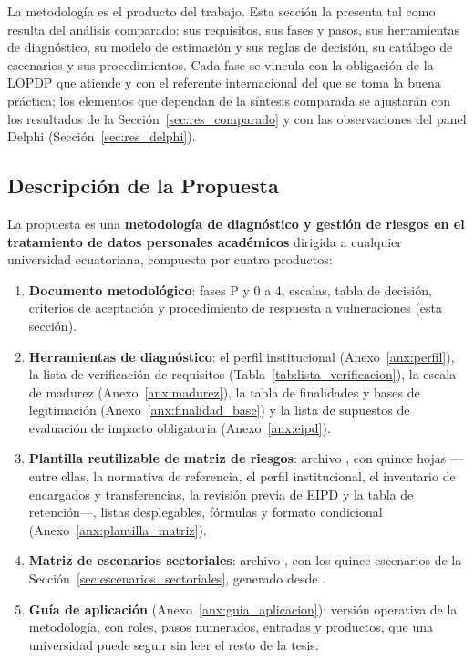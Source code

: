 La metodología es el producto del trabajo. Esta sección la presenta tal como resulta del análisis comparado: sus requisitos, sus fases y pasos, sus herramientas de diagnóstico, su modelo de estimación y sus reglas de decisión, su catálogo de escenarios y sus procedimientos. Cada fase se vincula con la obligación de la LOPDP que atiende y con el referente internacional del que se toma la buena práctica; los elementos que dependan de la síntesis comparada se ajustarán con los resultados de la Sección~\ref{sec:res_comparado} y con las observaciones del panel Delphi (Sección~\ref{sec:res_delphi}).

\subsection{Descripción de la Propuesta}
\label{sec:descripcion_propuesta}

La propuesta es una \textbf{metodología de diagnóstico y gestión de riesgos en el tratamiento de datos personales académicos} dirigida a cualquier universidad ecuatoriana, compuesta por cuatro productos:

\begin{enumerate}
  \item \textbf{Documento metodológico}: fases P y 0 a 4, escalas, tabla de decisión, criterios de aceptación y procedimiento de respuesta a vulneraciones (esta sección).
  \item \textbf{Herramientas de diagnóstico}: el perfil institucional (Anexo~\ref{anx:perfil}), la lista de verificación de requisitos (Tabla~\ref{tab:lista_verificacion}), la escala de madurez (Anexo~\ref{anx:madurez}), la tabla de finalidades y bases de legitimación (Anexo~\ref{anx:finalidad_base}) y la lista de supuestos de evaluación de impacto obligatoria (Anexo~\ref{anx:eipd}).
  \item \textbf{Plantilla reutilizable de matriz de riesgos}: archivo , con quince hojas ---entre ellas, la normativa de referencia, el perfil institucional, el inventario de encargados y transferencias, la revisión previa de EIPD y la tabla de retención---, listas desplegables, fórmulas y formato condicional (Anexo~\ref{anx:plantilla_matriz}).
  \item \textbf{Matriz de escenarios sectoriales}: archivo , con los quince escenarios de la Sección~\ref{sec:escenarios_sectoriales}, generado desde .
  \item \textbf{Guía de aplicación} (Anexo~\ref{anx:guia_aplicacion}): versión operativa de la metodología, con roles, pasos numerados, entradas y productos, que una universidad puede seguir sin leer el resto de la tesis.
\end{enumerate}

